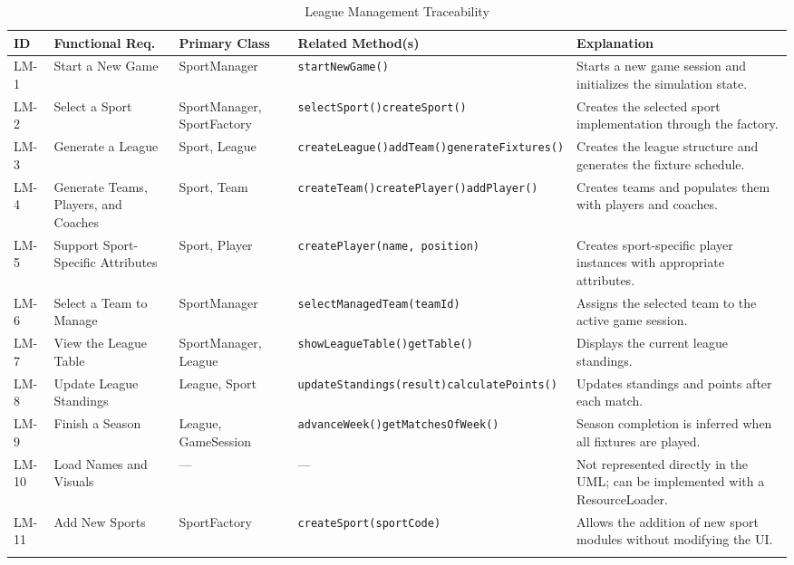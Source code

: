 \documentclass[12pt, a4paper]{article}
\begin{document}
{\footnotesize
\begin{longtable}{L{0.9cm} L{2.0cm} L{2.1cm} L{5.0cm} L{3.5cm}}
\toprule
\textbf{ID} & \textbf{Functional Req.} & \textbf{Primary Class} & \textbf{Related Method(s)} & \textbf{Explanation} \\
\midrule
\endhead
LM-1 & Start a New Game        & SportManager            & \texttt{startNewGame()}                          & Starts a new game session and initializes the simulation state. \\[0.4em]
LM-2 & Select a Sport          & SportManager, SportFactory & \texttt{selectSport()}\newline\texttt{createSport()}   & Creates the selected sport implementation through the factory. \\[0.4em]
LM-3 & Generate a League       & Sport, League           & \texttt{createLeague()}\newline\texttt{addTeam()}\newline\texttt{generateFixtures()} & Creates the league structure and generates the fixture schedule. \\[0.4em]
LM-4 & Generate Teams, Players, and Coaches & Sport, Team & \texttt{createTeam()}\newline\texttt{createPlayer()}\newline\texttt{addPlayer()} & Creates teams and populates them with players and coaches. \\[0.4em]
LM-5 & Support Sport-Specific Attributes & Sport, Player & \texttt{createPlayer(name, position)} & Creates sport-specific player instances with appropriate attributes. \\[0.4em]
LM-6 & Select a Team to Manage & SportManager            & \texttt{selectManagedTeam(teamId)} & Assigns the selected team to the active game session. \\[0.4em]
LM-7 & View the League Table   & SportManager, League    & \texttt{showLeagueTable()}\newline\texttt{getTable()}  & Displays the current league standings. \\[0.4em]
LM-8 & Update League Standings & League, Sport           & \texttt{updateStandings(result)}\newline\texttt{calculatePoints()} & Updates standings and points after each match. \\[0.4em]
LM-9 & Finish a Season         & League, GameSession     & \texttt{advanceWeek()}\newline\texttt{getMatchesOfWeek()} & Season completion is inferred when all fixtures are played. \\[0.4em]
LM-10 & Load Names and Visuals & —                       & —                           & Not represented directly in the UML; can be implemented with a ResourceLoader. \\[0.4em]
LM-11 & Add New Sports         & SportFactory            & \texttt{createSport(sportCode)} & Allows the addition of new sport modules without modifying the UI. \\
\bottomrule
\caption{League Management Traceability}
\end{longtable}
}
\end{document}
